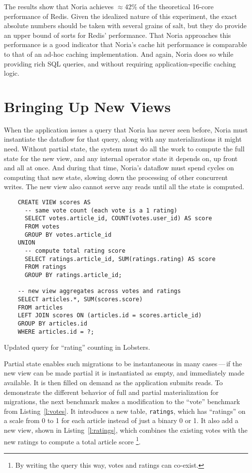 The results show that Noria achieves $\approx$42\% of the theoretical 16-core
performance of Redis. Given the idealized nature of this experiment, the exact
absolute numbers should be taken with several grains of salt, but they do
provide an upper bound of sorts for Redis' performance. That Noria approaches
this performance is a good indicator that Noria's cache hit performance is
comparable to that of an ad-hoc caching implementation. And again, Noria does so
while providing rich SQL queries, and without requiring application-specific
caching logic.

\section{Bringing Up New Views}
\label{s:eval:mig}

When the application issues a query that Noria has never seen before, Noria must
instantiate the dataflow for that query, along with any materializations it
might need. Without partial state, the system must do all the work to compute
the full state for the new view, and any internal operator state it depends on,
up front and all at once. And during that time, Noria's dataflow must spend
cycles on computing that new state, slowing down the processing of other
concurrent writes. The new view also cannot serve any reads until all the state
is computed.

\begin{listing}[h]
  \begin{verbatim}
    CREATE VIEW scores AS
      -- same vote count (each vote is a 1 rating)
      SELECT votes.article_id, COUNT(votes.user_id) AS score
      FROM votes
      GROUP BY votes.article_id
    UNION
      -- compute total rating score
      SELECT ratings.article_id, SUM(ratings.rating) AS score
      FROM ratings
      GROUP BY ratings.article_id;

    -- new view aggregates across votes and ratings
    SELECT articles.*, SUM(scores.score)
    FROM articles
    LEFT JOIN scores ON (articles.id = scores.article_id)
    GROUP BY articles.id
    WHERE articles.id = ?;
  \end{verbatim}
  \caption{Updated query for ``rating'' counting in Lobsters.}
  \label{l:ratings}
\end{listing}

Partial state enables such migrations to be instantaneous in many cases\,---\,if
the new view can be made partial it is instantiated as empty, and immediately
made available. It is then filled on demand as the application submits reads.
To demonstrate the different behavior of full and partial materialization for
migrations, the next benchmark makes a modification to the ``vote'' benchmark
from Listing~\ref{l:votes}. It introduces a new table, \texttt{ratings}, which
has ``ratings'' on a scale from 0 to 1 for each article instead of just a binary
0 or 1. It also add a new view, shown in Listing~\ref{l:ratings}, which combines
the existing votes with the new ratings to compute a total article score%
\footnote{By writing the query this way, votes and ratings can co-exist.}.


